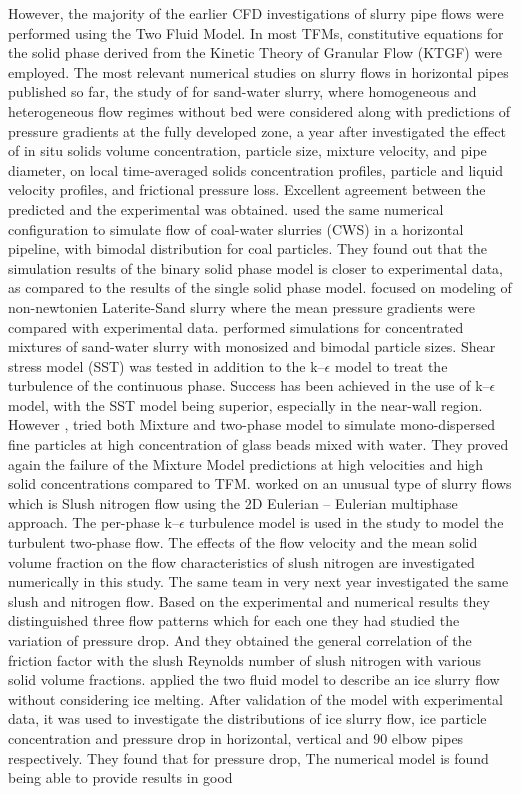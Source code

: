 \documentclass[review,3p,times,12pt]{elsarticle}
\begin{document}
However, the majority of the earlier CFD investigations of slurry pipe flows were performed using the Two Fluid Model. In most TFMs, constitutive equations for the solid phase derived from the Kinetic Theory of Granular Flow (KTGF) were employed. The most relevant numerical studies on slurry flows in horizontal pipes published so far, the study of  \citet{herna2008cfd} for sand-water slurry, where homogeneous and heterogeneous flow regimes without bed were considered along with predictions of pressure gradients at the fully developed zone, a year after \citet{Ekambara-2009} investigated the effect of in situ solids volume concentration, particle size, mixture velocity, and pipe diameter, on local time-averaged solids concentration profiles, particle and liquid velocity profiles, and frictional pressure loss. Excellent agreement between the predicted and the experimental was obtained. \citet{Liangyon-2009} used the same numerical configuration to simulate flow of coal-water slurries (CWS) in a horizontal pipeline, with bimodal distribution for coal particles. They found out that the simulation results of the binary solid phase model is closer to experimental data, as compared to the results of the single solid phase model. \citet{bossio2009eulerian} focused on modeling of non-newtonien Laterite-Sand slurry where the mean pressure gradients were compared with experimental data. \citet{antaya2012modelling}  performed simulations for concentrated mixtures of sand-water slurry with monosized and bimodal particle sizes. Shear stress model (SST) was tested in addition to the k–$\epsilon$ model to treat the turbulence of the continuous  phase. Success has been achieved in the use of  k–$\epsilon$ model,  with the SST model being superior, especially in the near-wall region. However \citet{D.R-2012}, tried both  Mixture and  two-phase model to simulate mono-dispersed fine particles at high concentration of glass beads mixed with water. They proved again the failure of the Mixture Model predictions at high velocities and high solid concentrations compared to TFM. \cite{Y.Y-2012} worked on an unusual type of slurry flows which is Slush nitrogen flow using the 2D Eulerian – Eulerian multiphase approach. The per-phase k–$\epsilon$ turbulence model is used in the study to model the turbulent two-phase flow. The effects of the flow velocity and the mean solid volume fraction on the flow characteristics of slush nitrogen are investigated numerically in this study. The same team in very next year \citet{Jiang-2013} investigated the same slush and nitrogen flow. Based on the experimental and numerical results they distinguished three flow patterns which for each one they had studied the variation of pressure drop. And they obtained the general correlation of the friction factor with the slush Reynolds number of slush nitrogen with various solid volume fractions. \citet{Wang-2013} applied the two fluid model to describe an ice slurry flow without considering ice melting. After validation of the model with experimental data, it was used to investigate  the distributions of ice slurry flow, ice particle concentration and pressure drop in horizontal, vertical and 90 elbow pipes respectively. They found that for pressure drop, The numerical model is found being able to provide results in good 
\end{document}
